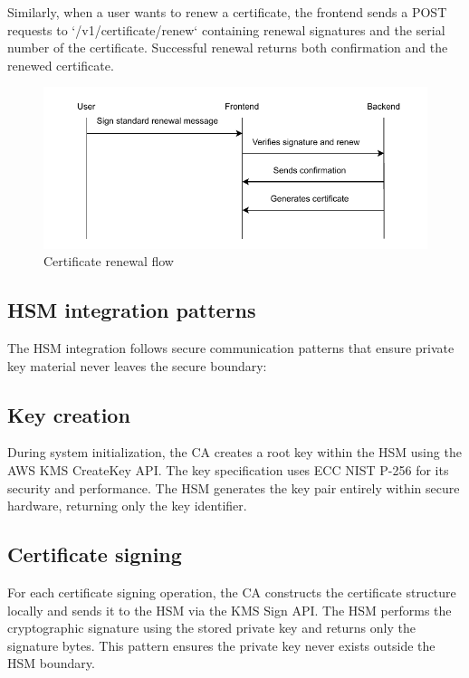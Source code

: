Similarly, when a user wants to renew a certificate, the frontend sends a POST 
requests to `/v1/certificate/renew` containing renewal signatures and the serial number of the 
certificate. Successful renewal returns both confirmation and the renewed certificate.

\begin{figure}[h!]
    \centering
    \includegraphics[keepaspectratio, width=\textwidth]{Pic/renew_certificate.pdf}
    \caption{Certificate renewal flow}
    \label{fig:certificate-revocation-flow}
\end{figure}

\subsection{HSM integration patterns}

The HSM integration follows secure communication patterns 
that ensure private key material never leaves the secure boundary:

\subsection{Key creation}
During system initialization, the CA creates a root key 
within the HSM using the AWS KMS CreateKey API. The key specification uses 
ECC NIST P-256 for its security and performance. The HSM generates the key 
pair entirely within secure hardware, returning only the key identifier.

\subsection{Certificate signing}
For each certificate signing operation, the CA 
constructs the certificate structure locally and sends it to the HSM via the 
KMS Sign API. The HSM performs the cryptographic signature using the stored 
private key and returns only the signature bytes. This pattern ensures the 
private key never exists outside the HSM boundary.

